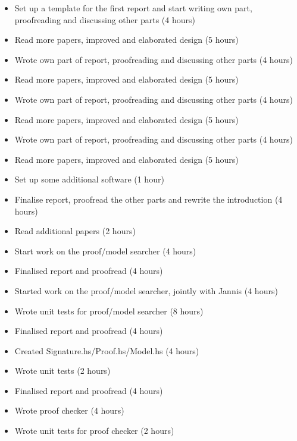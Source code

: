 %
{ \begin{itemize} 
    \item Set up a template for the first report and start writing own part,
proofreading and discussing other parts (4 hours)
    \item Read more papers, improved and elaborated design (5 hours)
 \end{itemize} 
}%
{ \begin{itemize} 
    \item Wrote own part of report, proofreading and discussing other parts (4 hours)
    \item Read more papers, improved and elaborated design (5 hours)
 \end{itemize} 
}%
{ \begin{itemize} 
    \item Wrote own part of report, proofreading and discussing other parts (4 hours)
    \item Read more papers, improved and elaborated design (5 hours)
 \end{itemize} 
}%
{ \begin{itemize} 
    \item Wrote own part of report, proofreading and discussing other parts (4 hours)
    \item Read more papers, improved and elaborated design (5 hours)
    \item Set up some additional software (1 hour)
 \end{itemize} 
}%

%
{ \begin{itemize} 
  \item Finalise report, proofread the other
parts and rewrite the introduction  (4 hours)
 \item Read additional papers (2 hours)
 \item Start work on the proof/model searcher (4 hours)
 \end{itemize} 
}%
{ \begin{itemize} 
 \item Finalised report and proofread (4 hours)
 \item Started work on the proof/model searcher, jointly with Jannis (4 hours)
 \item Wrote unit tests for proof/model searcher (8 hours)
 \end{itemize} 
}%
{ \begin{itemize} 
  \item Finalised report and proofread (4 hours)
  \item Created Signature.hs/Proof.hs/Model.hs (4 hours)
  \item Wrote unit tests (2 hours)
 \end{itemize} 
}%
{ \begin{itemize} 
  \item Finalised report and proofread (4 hours)
  \item Wrote proof checker  (4 hours)
  \item Wrote unit tests for proof checker  (2 hours)
 \end{itemize} 
}%


